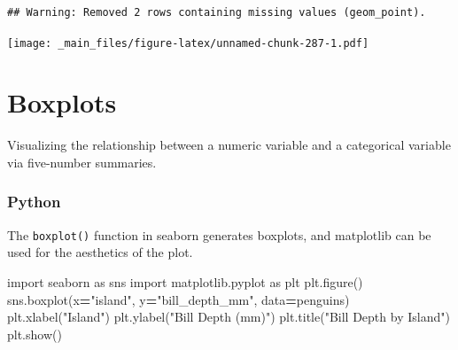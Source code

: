 \documentclass[
]{book}
\newenvironment{Shaded}{\begin{snugshade}}{\end{snugshade}}
\newcommand{\ImportTok}[1]{#1}
\newcommand{\NormalTok}[1]{#1}
\newcommand{\OperatorTok}[1]{\textcolor[rgb]{0.81,0.36,0.00}{\textbf{#1}}}
\newcommand{\StringTok}[1]{\textcolor[rgb]{0.31,0.60,0.02}{#1}}
\begin{document}
\begin{verbatim}
## Warning: Removed 2 rows containing missing values (geom_point).
\end{verbatim}

\texttt{[image: \_main\_files/figure-latex/unnamed-chunk-287-1.pdf]}

\hypertarget{boxplots}{%
\section{Boxplots}\label{boxplots}}

Visualizing the relationship between a numeric variable and a categorical variable via five-number summaries.

\hypertarget{python-45}{%
\subsubsection*{Python}\label{python-45}}

The \texttt{boxplot()} function in seaborn generates boxplots, and matplotlib can be used for the aesthetics of the plot.

\begin{Shaded}
\begin{Highlighting}[]
\ImportTok{import}\NormalTok{ seaborn }\ImportTok{as}\NormalTok{ sns}
\ImportTok{import}\NormalTok{ matplotlib.pyplot }\ImportTok{as}\NormalTok{ plt}
\NormalTok{plt.figure()}
\NormalTok{sns.boxplot(x}\OperatorTok{=}\StringTok{"island"}\NormalTok{, y}\OperatorTok{=}\StringTok{"bill\_depth\_mm"}\NormalTok{, data}\OperatorTok{=}\NormalTok{penguins)}
\NormalTok{plt.xlabel(}\StringTok{"Island"}\NormalTok{)}
\NormalTok{plt.ylabel(}\StringTok{"Bill Depth (mm)"}\NormalTok{)}
\NormalTok{plt.title(}\StringTok{"Bill Depth by Island"}\NormalTok{)}
\NormalTok{plt.show()}
\end{Highlighting}
\end{Shaded}
\end{document}
